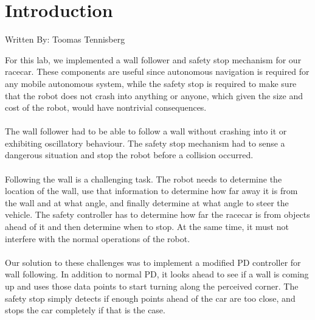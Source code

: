 \documentclass{article}
\begin{document}

\section{Introduction}
Written By: Toomas Tennisberg\\

For this lab, we implemented a wall follower and safety stop mechanism for our racecar. These components are useful since autonomous navigation is required for any mobile autonomous system, while the safety stop is required to make sure that the robot does not crash into anything or anyone, which given the size and cost of the robot, would have nontrivial consequences.\\\\
The wall follower had to be able to follow a wall without crashing into it or exhibiting oscillatory behaviour. The safety stop mechanism had to sense a dangerous situation and stop the robot before a collision occurred.\\\\
Following the wall is a challenging task. The robot needs to determine the location of the wall, use that information to determine how far away it is from the wall and at what angle, and finally determine at what angle to steer the vehicle. The safety controller has to determine how far the racecar is from objects ahead of it and then determine when to stop. At the same time, it must not interfere with the normal operations of the robot.\\\\
Our solution to these challenges was to implement a modified PD controller for wall following. In addition to normal PD, it looks ahead to see if a wall is coming up and uses those data points to start turning along the perceived corner. The safety stop simply detects if enough points ahead of the car are too close, and stops the car completely if that is the case. 
\end{document}
